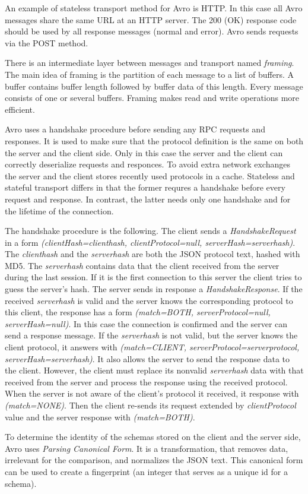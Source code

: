 An example of stateless transport method for Avro is HTTP.
In this case all Avro messages share the same URL at an HTTP server.
The 200 (OK) response code should be used by all response messages (normal and error).
Avro sends requests via the POST method.

There is an intermediate layer between messages and transport named \textit{framing}.
The main idea of framing is the partition of each message to a list of buffers.
A buffer contains buffer length followed by buffer data of this length.
Every message consists of one or several buffers.
Framing makes read and write operations more efficient.

Avro uses a handshake procedure before sending any RPC requests and responses.
It is used to make sure that the protocol definition is the same on both the server and the client side.
Only in this case the server and the client can correctly deserialize requests and responces.
To avoid extra network exchanges the server and the client stores recently used protocols in a cache.
Stateless and stateful transport differs in that the former requres a handshake before every request and response.
In contrast, the latter needs only one handshake and for the lifetime of the connection.

The handshake procedure is the following.
The client sends a \textit{HandshakeRequest} in a form \textit{(clientHash=clienthash, clientProtocol=null, serverHash=serverhash)}.
The \textit{clienthash} and the \textit{serverhash} are both the JSON protocol text, hashed with MD5.
The \textit{serverhash} contains data that the client received from the server during the last session.
If it is the first connection to this server the client tries to guess the server's hash.
The server sends in response a \textit{HandshakeResponse}.
If the received \textit{serverhash} is valid and the server knows the corresponding protocol to this client, the response has a form \textit{(match=BOTH, serverProtocol=null, serverHash=null)}.
In this case the connection is confirmed and the server can send a response message.
If the \textit{serverhash} is not valid, but the server knows the client protocol, it answers with \textit{(match=CLIENT, serverProtocol=serverprotocol, serverHash=serverhash)}.
It also allows the server to send the response data to the client.
However, the client must replace its nonvalid \textit{serverhash} data with that received from the server and process the response using the received protocol.
When the server is not aware of the client's protocol it received, it response with \textit{(match=NONE)}. 
Then the client re-sends its request extended by \textit{clientProtocol} value and the server response with \textit{(match=BOTH)}.

To determine the identity of the schemas stored on the client and the server side, Avro uses \textit{Parsing Canonical Form}.
It is a transformation, that removes data, irrelevant for the comparison, and normalizes the JSON text.
This canonical form can be used to create a fingerprint (an integer that serves as a unique id for a schema). 

 

